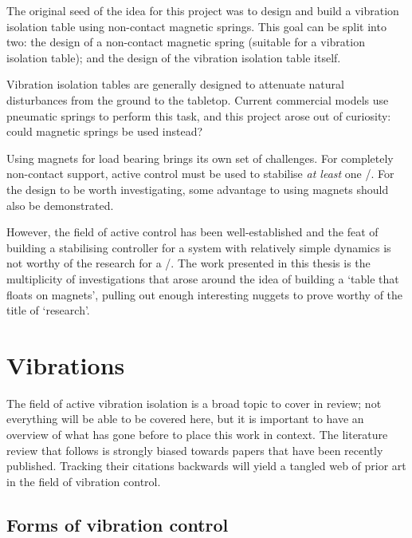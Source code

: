 \documentclass[11pt,a4paper]{memoir}
\begin{document}
The original seed of the idea for this project was to design and build a vibration isolation table using non-contact magnetic springs.
This goal can be split into two: the design of a non-contact magnetic spring (suitable for a vibration isolation table); and the design of the vibration isolation table itself.

Vibration isolation tables are generally designed to attenuate natural disturbances from the ground to the tabletop.
Current commercial models use pneumatic springs to perform this task, and this project arose out of curiosity: could magnetic springs be used instead?

Using magnets for load bearing brings its own set of challenges.
For completely non-contact support, active control must be used to stabilise \emph{at least} one \dof/.
For the design to be worth investigating, some advantage to using magnets should also be demonstrated.

However, the field of active control has been well-established and the feat of building a stabilising controller for a system with relatively simple dynamics is not worthy of the research for a \PhD/.
The work presented in this thesis is the multiplicity of investigations that arose around the idea of building a `table that floats on magnets', pulling out enough interesting nuggets to prove worthy of the title of `research'.





\section{Vibrations}

The field of active vibration isolation is a broad topic to cover in review; not everything will be able to be covered here, but it is important to have an overview of what has gone before to place this work in context.
The literature review that follows is strongly biased towards papers that have been recently published.
Tracking their citations backwards will yield a tangled web of prior art in the field of vibration control.

\subsection{Forms of vibration control}
\end{document}
